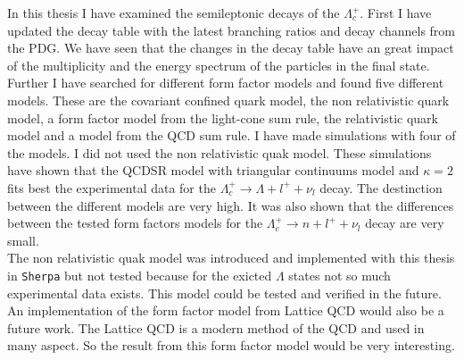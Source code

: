 In this thesis I have examined the semileptonic decays of the \(\Lambda_c^+\).
First I have updated the decay table with the latest branching ratios and 
decay channels from the PDG. We have seen that the changes in the decay table have an 
great impact of the multiplicity and the energy spectrum of the particles in 
the final state.\\
Further I have searched for different form factor models and found five 
different models. These are the covariant confined quark model, the non 
relativistic quark model, a form factor model from the light-cone sum rule, 
the relativistic quark model and a model from the QCD sum rule. I have made 
simulations with four of the models. I did not used the non relativistic quak model.
These simulations have shown that the QCDSR model with triangular continuums model 
and \(\kappa = 2\) fits best the experimental data for the 
\(\Lambda_c^+ \rightarrow \Lambda + l^+ + \nu_l\) decay. The destinction between 
the different models are very high. It was also shown that 
the differences between the tested form factors models for the 
\(\Lambda_c^+ \rightarrow n + l^+ + \nu_l\) decay are very small.\\

The non relativistic quak model \cite{NRQM} was introduced and implemented with 
this thesis in \texttt{Sherpa} but not tested because for the exicted \(\Lambda\) states 
 not so much experimental data exists. This model could be tested and verified
 in the future.
An implementation of the form factor model from Lattice QCD \cite{Lattice_QCD} 
would also be a future work. 
The Lattice QCD is a modern method of the QCD and used in many aspect. So 
the result from this form factor model would be very interesting.
